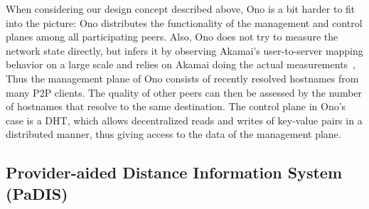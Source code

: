 When considering our design concept described above, Ono is a bit harder to fit
into the picture: Ono distributes the functionality of the management and
control planes among all participating peers.  Also, Ono does not try to
measure the network state directly, but infers it by observing Akamai's
user-to-server mapping behavior on a large scale and relies on Akamai doing the
actual measurements~\cite{Akamai-Network}, Thus the management plane of Ono
consists of recently resolved hostnames from many P2P clients. The quality of
other peers can then be assessed by the number of hostnames that resolve to the
same destination.  The control plane in Ono's case is a DHT, which allows
decentralized reads and writes of key-value pairs in a distributed manner, thus
giving access to the data of the management plane.

\subsection{Provider-aided Distance Information System (PaDIS)}\label{PaDIS-Opportunities-for-Collaboration}
\newcommand{\assignmentenabler}{{informed user-server as\-sign\-ment}\xspace}
\newcommand{\assignment}{{user-server as\-sign\-ment}\xspace}
\newcommand{\assignmentproblem}{{informed user-server as\-sign\-ment problem}\xspace}


